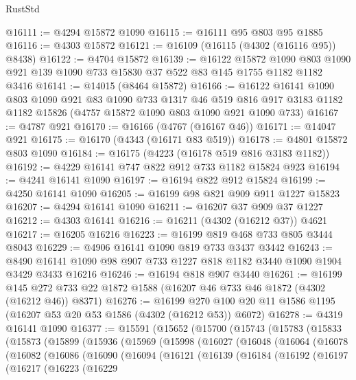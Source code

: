 \begin{lexlean}{RustStd}
\begin{coremodule}
@16111 := @4294 @15872 @1090
@16115 := @16111 @95 @803 @95 @1885
@16116 := @4303 @15872
@16121 := @16109 (@16115 (@4302 (@16116 @95)) @8438)
@16122 := @4704 @15872
@16139 := @16122
    @15872
    @1090
    @803
    @1090
    @921
    @139
    @1090
    @733
    @15830
    @37
    @522
    @83
    @145
    @1755
    @1182
    @1182
    @3416
@16141 := @14015 (@8464 @15872)
@16166 := @16122
    @16141
    @1090
    @803
    @1090
    @921
    @83
    @1090
    @733
    @1317
    @46
    @519
    @816
    @917
    @3183
    @1182
    @1182
    @15826
    (@4757 @15872 @1090 @803 @1090 @921 @1090 @733)
@16167 := @4787 @921
@16170 := @16166 (@4767 (@16167 @46))
@16171 := @14047 @921
@16175 := @16170 (@4343 (@16171 @83 @519))
@16178 := @4801 @15872 @803 @1090
@16184 := @16175 (@4223 (@16178 @519 @816 @3183 @1182))
@16192 := @4229 @16141 @747 @822 @912 @733 @1182 @15824 @923
@16194 := @4241 @16141 @1090
@16197 := @16194 @822 @912 @15824
@16199 := @4250 @16141 @1090
@16205 := @16199 @98 @821 @909 @911 @1227 @15823
@16207 := @4294 @16141 @1090
@16211 := @16207 @37 @909 @37 @1227
@16212 := @4303 @16141
@16216 := @16211 (@4302 (@16212 @37)) @4621
@16217 := @16205 @16216
@16223 := @16199 @819 @468 @733 @805 @3444 @8043
@16229 := @4906 @16141 @1090 @819 @733 @3437 @3442
@16243 := @8490 @16141 @1090 @98 @907 @733 @1227 @818 @1182 @3440 @1090 @1904 @3429 @3433 @16216
@16246 := @16194 @818 @907 @3440
@16261 := @16199
    @145
    @272
    @733
    @22
    @1872
    @1588
    (@16207 @46 @733 @46 @1872 (@4302 (@16212 @46)) @8371)
@16276 := @16199 @270 @100 @20 @11 @1586 @1195 (@16207 @53 @20 @53 @1586 (@4302 (@16212 @53)) @6072)
@16278 := @4319 @16141 @1090
@16377 := @15591
    (@15652
      (@15700
        (@15743
          (@15783
            (@15833
              (@15873
                (@15899
                  (@15936
                    (@15969
                      (@15998
                        (@16027
                          (@16048
                            (@16064
                              (@16078
                                (@16082
                                  (@16086
                                    (@16090
                                      (@16094
                                        (@16121
                                          (@16139
                                            (@16184
                                              (@16192
                                                (@16197
                                                  (@16217
                                                    (@16223
                                                      (@16229

\end{coremodule}
\end{lexlean}
